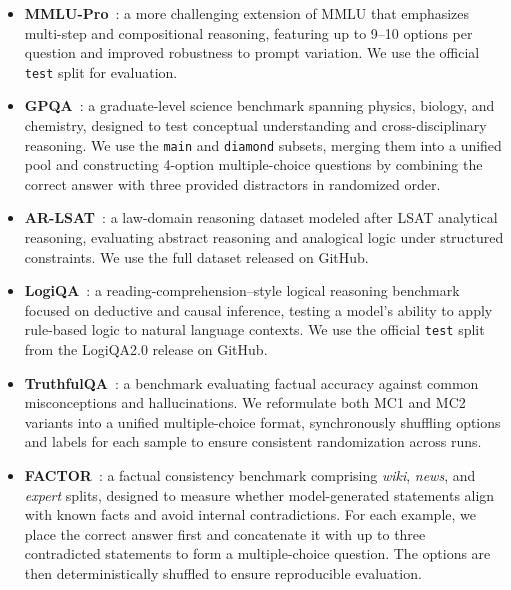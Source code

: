 \documentclass{article}
\begin{document}
\begin{itemize}
    \item \textbf{MMLU-Pro}~\cite{wang2024mmlupro}: a more challenging extension of MMLU that emphasizes multi-step and compositional reasoning, featuring up to 9--10 options per question and improved robustness to prompt variation. We use the official \texttt{test} split for evaluation.
    \item \textbf{GPQA}~\cite{rein2024gpqa}: a graduate-level science benchmark spanning physics, biology, and chemistry, designed to test conceptual understanding and cross-disciplinary reasoning. We use the \texttt{main} and \texttt{diamond} subsets, merging them into a unified pool and constructing 4-option multiple-choice questions by combining the correct answer with three provided distractors in randomized order.
    \item \textbf{AR-LSAT}~\cite{zhong2021arlsat}: a law-domain reasoning dataset modeled after LSAT analytical reasoning, evaluating abstract reasoning and analogical logic under structured constraints. We use the full dataset released on GitHub.
    \item \textbf{LogiQA}~\cite{liu2021logiqa}: a reading-comprehension–style logical reasoning benchmark focused on deductive and causal inference, testing a model’s ability to apply rule-based logic to natural language contexts. We use the official \texttt{test} split from the LogiQA2.0 release on GitHub.
    \item \textbf{TruthfulQA}~\cite{lin2022truthfulqa}: a benchmark evaluating factual accuracy against common misconceptions and hallucinations. We reformulate both MC1 and MC2 variants into a unified multiple-choice format, synchronously shuffling options and labels for each sample to ensure consistent randomization across runs.
    \item \textbf{FACTOR}~\cite{muhlgay2024factor}: a factual consistency benchmark comprising \emph{wiki}, \emph{news}, and \emph{expert} splits, designed to measure whether model-generated statements align with known facts and avoid internal contradictions. For each example, we place the correct answer first and concatenate it with up to three contradicted statements to form a multiple-choice question. The options are then deterministically shuffled to ensure reproducible evaluation.
\end{itemize}
\end{document}
